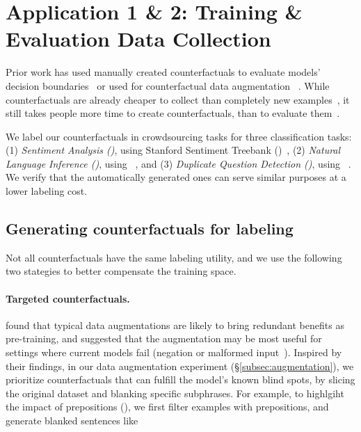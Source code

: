 \section{Application 1 \& 2: Training \& Evaluation Data Collection}
\label{sec:app_label}

Prior work has used manually created counterfactuals to evaluate models' decision boundaries~\cite{gardner2020contrast} or used for counterfactual data augmentation~\cite{kaushik2019learning} .
While counterfactuals are already cheaper to collect than completely new examples~\cite{Khashabi2020MoreBF}, it still takes people more time to create counterfactuals, than to evaluate them~\cite{ribeiro2018sear}. 

We label our counterfactuals in crowdsourcing tasks for three classification tasks: 
(1) \emph{Sentiment Analysis (\sst)}, using Stanford Sentiment Treebank (\dsst)~\cite{socher2013recursive},
(2) \emph{Natural Language Inference (\nli)}, using \dnli~\cite{bowman-etal-2015-large}, and 
(3) \emph{Duplicate Question Detection (\qqp)}, using \dqqp~\cite{wang2018glue}.
We verify that the automatically generated ones can serve similar purposes at a lower labeling cost.


\subsection{Generating counterfactuals for labeling}
\label{subsec:gen_counterfactual_for_labeling}
Not all counterfactuals have the same labeling utility, and we use the following two stategies to better compensate the training space.


\paragraph{Targeted counterfactuals.}
\citet{longpre2020effective} found that typical data augmentations are likely to bring redundant benefits as pre-training, and suggested that the augmentation may be most useful for settings where current models fail (\eg negation or malformed input~\cite{rogers2020primer,ettinger2020bert}).
Inspired by their findings, in our data augmentation experiment (\S\ref{subsec:augmentation}), we prioritize counterfactuals that can fulfill the model's known blind spots, by slicing the original dataset and blanking specific subphrases.  
For example, to highlgiht the impact of prepositions (\eg {}), we first filter examples with prepositions, and generate blanked sentences like 

